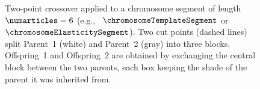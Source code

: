 \begin{figure}[htbp]
    \caption{Two-point crossover applied to a chromosome segment of length $\numarticles=6$ (e.g., \ $\chromosomeTemplateSegment$ or $\chromosomeElasticitySegment$). Two cut points (dashed lines) split Parent~1 (white) and Parent~2 (gray) into three blocks. Offspring~1 and Offspring~2 are obtained by exchanging the central block between the two parents, each box keeping the shade of the parent it was inherited from.}
    \label{fig:two_point_crossover}
\end{figure}
